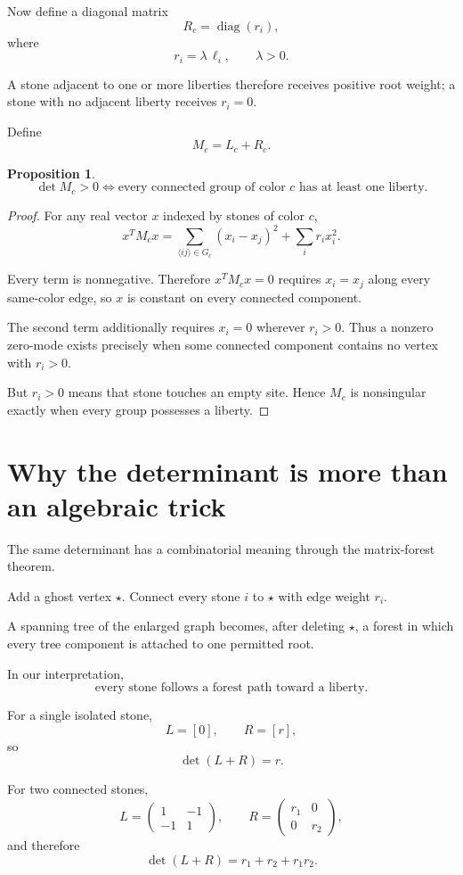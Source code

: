 \documentclass[11pt]{article}
\newtheorem{proposition}{Proposition}
\begin{document}
Now define a diagonal matrix
\[
R_c=\operatorname{diag}(r_i),
\]
where
\[
r_i=\lambda\,\ell_i,
\qquad \lambda>0.
\]

A stone adjacent to one or more liberties therefore receives positive root weight; a stone with no adjacent liberty receives \(r_i=0\).

Define
\[
\boxed{
M_c=L_c+R_c.
}
\]

\begin{proposition}
\[
\det M_c>0
\iff
\text{every connected group of color }c\text{ has at least one liberty}.
\]
\end{proposition}

\begin{proof}
For any real vector \(x\) indexed by stones of color \(c\),
\[
x^TM_cx
=
\sum_{\langle ij\rangle\in G_c}(x_i-x_j)^2
+
\sum_i r_i x_i^2.
\]

Every term is nonnegative. Therefore \(x^TM_cx=0\) requires \(x_i=x_j\) along every same-color edge, so \(x\) is constant on every connected component.

The second term additionally requires \(x_i=0\) wherever \(r_i>0\). Thus a nonzero zero-mode exists precisely when some connected component contains no vertex with \(r_i>0\).

But \(r_i>0\) means that stone touches an empty site. Hence \(M_c\) is nonsingular exactly when every group possesses a liberty.
\end{proof}

\section{Why the determinant is more than an algebraic trick}

The same determinant has a combinatorial meaning through the matrix-forest theorem.

Add a ghost vertex \(\star\). Connect every stone \(i\) to \(\star\) with edge weight \(r_i\).

A spanning tree of the enlarged graph becomes, after deleting \(\star\), a forest in which every tree component is attached to one permitted root.

In our interpretation,
\[
\boxed{
\text{every stone follows a forest path toward a liberty.}
}
\]

For a single isolated stone,
\[
L=[0],
\qquad
R=[r],
\]
so
\[
\det(L+R)=r.
\]

For two connected stones,
\[
L=
\begin{pmatrix}
1&-1\\
-1&1
\end{pmatrix},
\qquad
R=
\begin{pmatrix}
r_1&0\\
0&r_2
\end{pmatrix},
\]
and therefore
\[
\det(L+R)=r_1+r_2+r_1r_2.
\]
\end{document}

